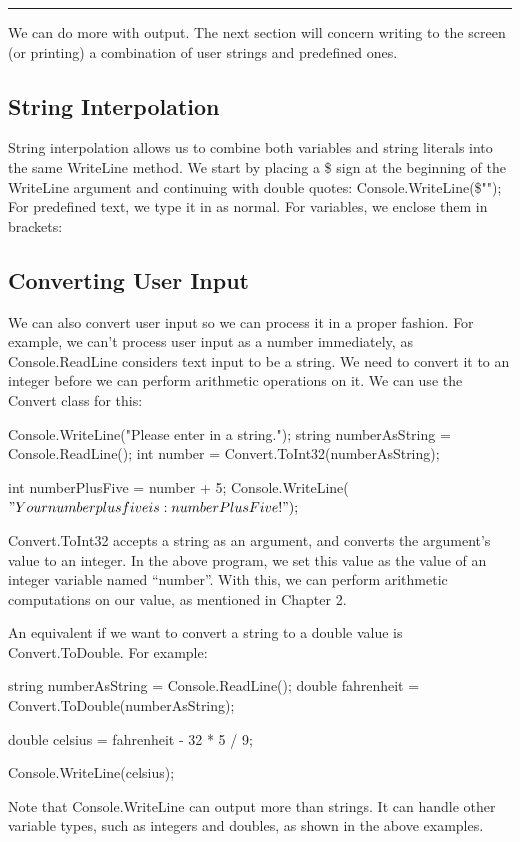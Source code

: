 \documentclass[oneside, openany] {book}
\begin{document}
\rule{\textwidth}{0.4pt}
We can do more with output. The next section will concern writing to the screen (or printing) a combination of user strings and predefined ones.
\subsection{String Interpolation}

 String interpolation allows us to combine both variables and string literals into the same WriteLine method. We start by placing a \$ sign at the beginning of the WriteLine argument and continuing with double quotes:
Console.WriteLine(\$"");
For predefined text, we type it in as normal. For variables, we enclose them in brackets:

\subsection{Converting User Input}
 We can also convert user input so we can process it in a proper fashion. For example, we can’t process user input as a number immediately, as Console.ReadLine considers text input to be a string. We need to convert it to an integer before we can perform arithmetic operations on it. We can use the Convert class for this:
\begin{CSharp}
Console.WriteLine("Please enter in a string.");
string numberAsString = Console.ReadLine();
int number = Convert.ToInt32(numberAsString);

int numberPlusFive = number + 5;
Console.WriteLine($"Your number plus five is: {numberPlusFive}!");$
\end{CSharp}
Convert.ToInt32 accepts a string as an argument, and converts the argument's value to an integer. In the above program, we set this value as the value of an integer variable named “number”. With this, we can perform arithmetic computations on our value, as mentioned in Chapter 2.

An equivalent if we want to convert a string to a double value is Convert.ToDouble. For example:

\begin{CSharp}
string numberAsString = Console.ReadLine();
double fahrenheit = Convert.ToDouble(numberAsString);

double celsius = fahrenheit - 32 * 5 / 9;

Console.WriteLine(celsius);

\end{CSharp}
Note that Console.WriteLine can output more than strings. It can handle other variable types, such as integers and doubles, as shown in the above examples.
\end{document}
